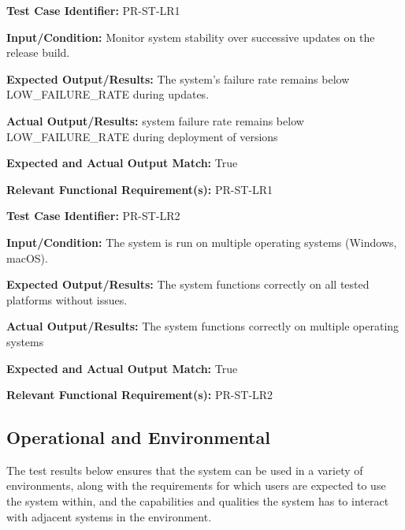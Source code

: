 \documentclass[12pt, titlepage]{article}
\begin{document}
\begin{mdframed}[linewidth=0.5mm]
  \textbf{Test Case Identifier:} PR-ST-LR1 \par
  \textbf{Input/Condition:} Monitor system stability over successive updates on the release build. \par
  \textbf{Expected Output/Results:} The system’s failure rate remains below \\LOW\_FAILURE\_RATE during updates. \par
  \textbf{Actual Output/Results:} system failure rate remains below \\LOW\_FAILURE\_RATE during deployment of versions \par
  \textbf{Expected and Actual Output Match:} True \par
  \textbf{Relevant Functional Requirement(s):} PR-ST-LR1
\end{mdframed}

\begin{mdframed}[linewidth=0.5mm]
  \textbf{Test Case Identifier:} PR-ST-LR2 \par
  \textbf{Input/Condition:} The system is run on multiple operating systems (Windows, macOS). \par
  \textbf{Expected Output/Results:} The system functions correctly on all tested platforms without issues. \par
  \textbf{Actual Output/Results:} The system functions correctly on multiple operating systems\par
  \textbf{Expected and Actual Output Match:} True \par
  \textbf{Relevant Functional Requirement(s):} PR-ST-LR2
\end{mdframed}

\newpage{}

\subsection{Operational and Environmental}
\hspace{2em}The test results below ensures that the system can be used in a variety of environments,
along with the requirements for which users are expected to use the system within, and the
capabilities and qualities the system has to interact with adjacent systems in the environment.
\end{document}
